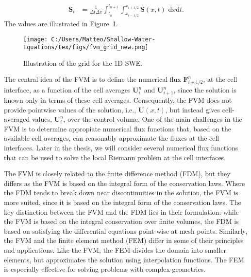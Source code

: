 \begin{align*}
    \mathbf{S}_i &= \frac{1}{\Delta t \Delta x} \int_{t_n}^{t_{n+1}} \int_{x_{i-1/2}}^{x_{i+1/2}} \mathbf{S}(x,t) \text{ d}x\text{d}t.
\end{align*}
The values are illustrated in Figure~\ref{fig:10_3}.
\begin{figure}[H]
    \centering
    \texttt{[image: C:/Users/Matteo/Shallow-Water-Equations/tex/figs/fvm\_grid\_new.png]}
    \caption{Illustration of the grid for the 1D SWE.}\label{fig:10_3}
\end{figure}
The central idea of the FVM is to define the numerical flux $\mathbf{F}_{i+1/2}^n$, at the cell interface, as a function of the cell averages $\mathbf{U}_i^n$ and $\mathbf{U}_{i+1}^n$, since the solution is known only in terms of these cell averages.
Consequently, the FVM does not provide pointwise values of the solution, i.e., $\mathbf{U}(x,t)$, but instead gives cell-averaged values, $\mathbf{U}_i^n$, over the control volume.
One of the main challenges in the FVM is to determine appropiate numerical flux functions that, based on the available cell averages, can reasonably approximate the fluxes at the cell interfaces. 
Later in the thesis, we will consider several numerical flux functions that can be used to solve the local Riemann problem at the cell interfaces.

The FVM is closely related to the finite difference method (FDM), but they differs as the FVM is based on the integral form of the conservation laws.
Where the FDM tends to break down near discontinuities in the solution, the FVM is more suited, since it is based on the integral form of the conservation laws.
The key distinction between the FVM and the FDM lies in their formulation: while the FVM is based on the integral conservation over finite volumes, the FDM is based on satisfying the differential equations point-wise at mesh points.
Similarly, the FVM and the finite element method (FEM) differ in some of their principles and applications.
Like the FVM, the FEM divides the domain into smaller elements, but approximates the solution using interpolation functions.
The FEM is especially effective for solving problems with complex geometries.


